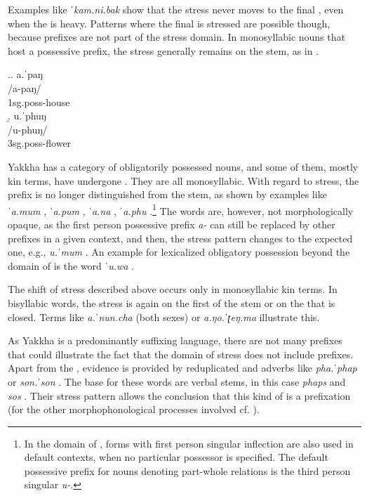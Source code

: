 Examples like \emph{ˈkam.ni.bak}  show that the stress never moves to the final , even when the  is heavy. Patterns where the final  is stressed are possible though, because prefixes are not part of the stress domain. In monosyllabic nouns that host a possessive prefix, the stress generally remains on the stem, as in  \Next.


\ex.\a. \glll a.ˈpaŋ\\
/a-paŋ/\\
{\sc 1sg.poss-}house\\
\b. \glll u.ˈphuŋ\\
/u-phuŋ/\\
{\sc 3sg.poss-}flower\\


Yakkha has a category of obligatorily possessed nouns, and some of them, mostly kin terms, have undergone  . They are all monosyllabic. With regard to  stress, the prefix is no longer distinguished from the stem, as shown by examples like \emph{ˈa.mum} , \emph{ˈa.pum} , \emph{ˈa.na} , \emph{ˈa.phu} .\footnote{In the domain of , forms with first person singular inflection are also used in default contexts, when no particular possessor is specified. The default possessive prefix for nouns denoting part-whole relations is the third person singular \emph{u-}.} The words are, however, not morphologically opaque, as the first person possessive prefix \emph{a-} can still be replaced by other prefixes in a given context, and then, the stress pattern changes to the expected one, e.g., \emph{u.ˈmum} . An example for lexicalized obligatory possession beyond the domain of  is the word \emph{ˈu.wa} .

The shift of stress described above occurs only in monosyllabic kin terms. In bisyllabic words, the stress is again on the first   of the stem or on the  that is closed. Terms like \emph{a.ˈnun.cha}  (both sexes) or \emph{a.ŋo.ˈʈeŋ.ma}  illustrate this.


As Yakkha is a predominantly suffixing language, there are not many prefixes that could illustrate the fact that the domain of stress does not include prefixes. Apart from the , evidence is provided by reduplicated  and adverbs like \emph{pha.ˈphap}  or \emph{son.ˈson} . The base for these words are verbal stems, in this case \emph{phaps}  and \emph{sos} . Their stress pattern allows the conclusion that this kind of  is a prefixation (for the other morphophonological processes involved cf. ).


